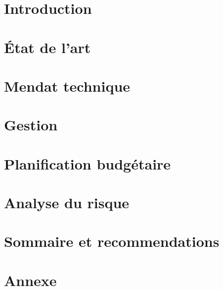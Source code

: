 \documentclass[canadien, 10pt]{article}
\begin{document}



\newpage


\tableofcontents
\newpage

\listoffigures
\listoftables
\newpage


\section{Introduction}


\section{État de l'art}


\section{Mendat technique}


\section{Gestion}


\section{Planification budgétaire}


\section{Analyse du risque}


\section{Sommaire et recommendations}


\section{Annexe}


\newpage
{}

\end{document}
